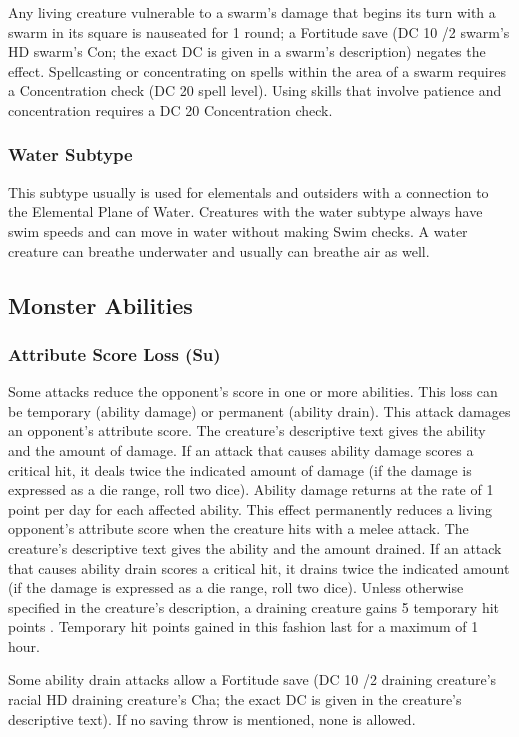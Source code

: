  Any living creature vulnerable to a swarm's damage that begins its turn with a swarm in its square is nauseated for 1 round; a Fortitude save (DC 10 /2 swarm's HD \add swarm's Con; the exact DC is given in a swarm's description) negates the effect. Spellcasting or concentrating on spells within the area of a swarm requires a Concentration check (DC 20 \add {} spell level). Using skills that involve patience and concentration requires a DC 20 Concentration check.

\subsubsection{Water Subtype} This subtype usually is used for elementals and outsiders with a connection to the Elemental Plane of Water. Creatures with the water subtype always have swim speeds and can move in water without making Swim checks. A water creature can breathe underwater and usually can breathe air as well.

\subsection{Monster Abilities}

\subsubsection{Attribute Score Loss (Su)} Some attacks reduce the opponent's score in one or more abilities. This loss can be temporary (ability damage) or permanent (ability drain).
 This attack damages an opponent's attribute score. The creature's descriptive text gives the ability and the amount of damage. If an attack that causes ability damage scores a critical hit, it deals twice the indicated amount of damage (if the damage is expressed as a die range, roll two dice). Ability damage returns at the rate of 1 point per day for each affected ability.
 This effect permanently reduces a living opponent's attribute score when the creature hits with a melee attack. The creature's descriptive text gives the ability and the amount drained. If an attack that causes ability drain scores a critical hit, it drains twice the indicated amount (if the damage is expressed as a die range, roll two dice). Unless otherwise specified in the creature's description, a draining creature gains 5 temporary hit points . Temporary hit points gained in this fashion last for a maximum of 1 hour.
\par Some ability drain attacks allow a Fortitude save (DC 10 /2 draining creature's racial HD \add draining creature's Cha; the exact DC is given in the creature's descriptive text). If no saving throw is mentioned, none is allowed.

